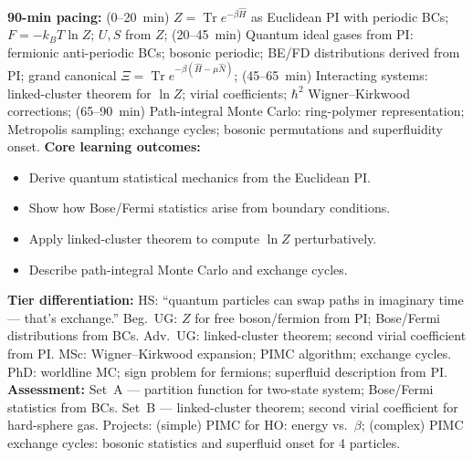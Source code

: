 \documentclass[11pt,a4paper]{article}
\begin{document}
\begin{tcolorbox}[modulebox, title={Module~II.2 / L06: Statistical Mechanics Connection}]
\textbf{90-min pacing:} (0--20~min) $Z=\operatorname{Tr}e^{-\beta\hat{H}}$ as Euclidean PI with periodic BCs; $F=-k_BT\ln Z$; $U,S$ from $Z$; (20--45~min) Quantum ideal gases from PI: fermionic anti-periodic BCs; bosonic periodic; BE/FD distributions derived from PI; grand canonical $\Xi=\operatorname{Tr}e^{-\beta(\hat{H}-\mu\hat{N})}$; (45--65~min) Interacting systems: linked-cluster theorem for $\ln Z$; virial coefficients; $\hbar^2$ Wigner--Kirkwood corrections; (65--90~min) Path-integral Monte Carlo: ring-polymer representation; Metropolis sampling; exchange cycles; bosonic permutations and superfluidity onset.
\medskip\textbf{Core learning outcomes:}
\begin{itemize}[leftmargin=1.4em,topsep=2pt,itemsep=1pt]
  \item Derive quantum statistical mechanics from the Euclidean PI.
  \item Show how Bose/Fermi statistics arise from boundary conditions.
  \item Apply linked-cluster theorem to compute $\ln Z$ perturbatively.
  \item Describe path-integral Monte Carlo and exchange cycles.
\end{itemize}
\medskip\textbf{Tier differentiation:}
HS: ``quantum particles can swap paths in imaginary time --- that's exchange.''
Beg.\ UG: $Z$ for free boson/fermion from PI; Bose/Fermi distributions from BCs.
Adv.\ UG: linked-cluster theorem; second virial coefficient from PI.
MSc: Wigner--Kirkwood expansion; PIMC algorithm; exchange cycles.
PhD: worldline MC; sign problem for fermions; superfluid description from PI.
\medskip\textbf{Assessment:}
Set~A --- partition function for two-state system; Bose/Fermi statistics from BCs.
Set~B --- linked-cluster theorem; second virial coefficient for hard-sphere gas.
Projects: (simple) PIMC for HO: energy vs.\ $\beta$; (complex) PIMC exchange cycles: bosonic statistics and superfluid onset for 4 particles.
\end{tcolorbox}

\medskip
\end{document}
